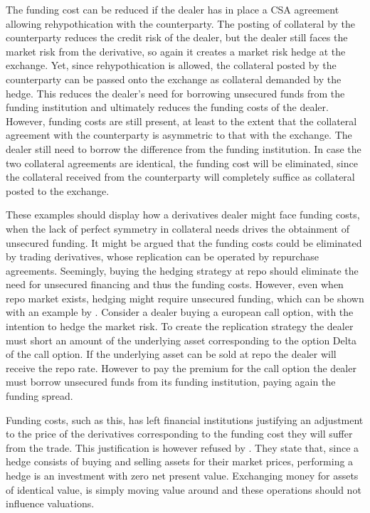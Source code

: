 \documentclass[../../../main.tex]{subfiles}
\begin{document}
        The funding cost can be reduced if the dealer has in place a CSA agreement allowing rehypothication with the counterparty.
        The posting of collateral by the counterparty reduces the credit risk of the dealer,
        but the dealer still faces the market risk from the derivative, 
        so again it creates a market risk hedge at the exchange.
        Yet, since rehypothication is allowed,
        the collateral posted by the counterparty can be passed onto the exchange as collateral demanded by the hedge.
        This reduces the dealer's need for borrowing unsecured funds from the funding institution 
        and ultimately reduces the funding costs of the dealer.
        However, funding costs are still present, 
        at least to the extent that the collateral agreement with the counterparty is asymmetric to that with the exchange.
        The dealer still need to borrow the difference from the funding institution.
        In case the two collateral agreements are identical, the funding cost will be eliminated, 
        since the collateral received from the counterparty will completely suffice as collateral posted to the exchange.

        These examples should display how a derivatives dealer might face funding costs,
        when the lack of perfect symmetry in collateral needs drives the obtainment of unsecured funding.
        It might be argued that the funding costs could be eliminated by trading derivatives,
        whose replication can be operated by repurchase agreements. 
        Seemingly, buying the hedging strategy at repo should eliminate the need for unsecured financing
        and thus the funding costs. 
        However, even when repo market exists, hedging might require unsecured funding,
        which can be shown with an example by \cite{Castagna2012FVA}.
        Consider a dealer buying a european call option, with the intention to hedge the market risk.
        To create the replication strategy the dealer must short an amount of the underlying asset corresponding to the option Delta of the call option.
        If the underlying asset can be sold at repo the dealer will receive the repo rate.
        However to pay the premium for the call option the dealer must borrow unsecured funds from its funding institution,
        paying again the funding spread. 

        Funding costs, such as this, has left financial institutions justifying an adjustment to the price of the derivatives
        corresponding to the funding cost they will suffer from the trade.
        This justification is however refused by \cite{HullWhite2012FVA}.
        They state that, since a hedge consists of buying and selling assets for their market prices,
        performing a hedge is an investment with zero net present value.
        Exchanging money for assets of identical value,
        is simply moving value around and these operations should not influence valuations. 
\end{document}
